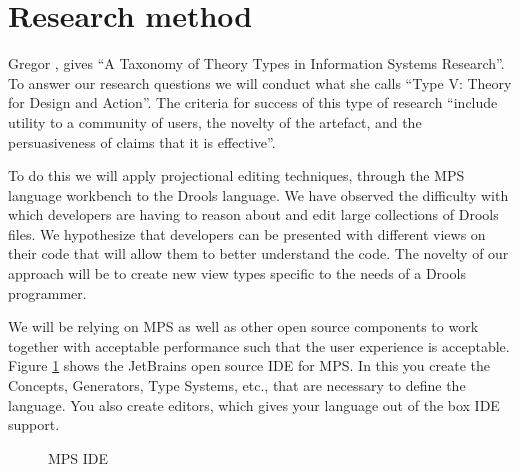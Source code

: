 \section{Research method} 

Gregor \cite{gregor2006nature}, gives “A Taxonomy of Theory Types in Information Systems Research”. 
To answer our research questions we will conduct what she calls “Type V: Theory for Design and Action”. 
The criteria for success of this type of research “include utility to a community of users, the novelty of the artefact, and the persuasiveness of claims that it is effective”.

To do this we will apply projectional editing techniques, through the MPS language workbench to the Drools language.
We have observed the difficulty with which developers are having to reason about and edit large collections of Drools files.
We hypothesize that developers can be presented with different views on their code that will allow them to better understand the code.
The novelty of our approach will be to create new view types specific to the needs of a Drools programmer.

We will be relying on MPS as well as other open source components to work together with acceptable performance such that the user experience is acceptable.
Figure \ref{fig:MPS_IDE} shows the JetBrains open source IDE for MPS. 
In this you create the Concepts, Generators, Type Systems, etc., that are necessary to define the language.
You also create editors, which gives your language out of the box IDE support.

\begin{figure}[H]
    \centering
    \caption{MPS IDE}
    \label{fig:MPS_IDE}
\end{figure}

